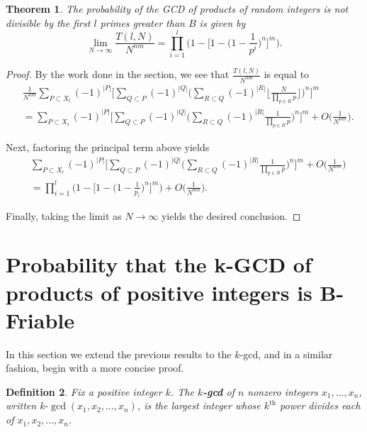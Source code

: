\documentclass[12pt]{amsart}
\newtheorem{theorem}{Theorem}[subsection]
\newtheorem{definition}[theorem]{Definition}
\theoremstyle{definition}
\begin{document}
\begin{theorem} The probability of the GCD of products of random integers is not divisible by the first $l$ primes greater than $B$ is given by 
	$$\lim_{N\to\infty} \frac{T(l,N)}{N^{nm}} = \prod_{i=1}^{l} \Big(1 - \Big[1 - \Big(1-\frac{1}{p^i}\Big)^n\Big]^m\Big).$$
\end{theorem}

\begin{proof}
	By the work done in the section, we see that $\displaystyle \frac{T(l,N)}{N^{nm}}$ is equal to 
	\begin{align*}
		&\frac{1}{N^{nm}}\sum_{P\subset X_l}{(-1)^{|P|}}\Big[\sum_{Q\subset P}(-1)^{|Q|}\Big(\sum_{R\subset Q}(-1)^{|R|}\Big\lfloor\frac{N}{\prod_{p\in R} p} \Big\rfloor\Big)^n\Big]^m\\
		&= \sum_{P\subset X_l}{(-1)^{|P|}} \Big[\sum_{Q\subset P}(-1)^{|Q|} \Big(\sum_{R\subset Q}(-1)^{|R|} \frac{1}{\prod_{p\in R} p}\Big)^n\Big]^m+O\Big(\frac{1}{N^{nm}}\Big).
	\end{align*}
	
	\noindent Next, factoring the principal term above yields
	\begin{align*}
		&\sum_{P\subset X_l}{(-1)^{|P|}} \Big[\sum_{Q\subset P}(-1)^{|Q|} \Big(\sum_{R\subset Q}(-1)^{|R|}\frac{1}{\prod_{p\in R} p}\Big)^n \Big]^m + O\Big(\frac{1}{N^{nm}}\Big)\\ &= \prod_{i=1}^{l} \Big(1 - \Big[1 - \Big(1 - \frac{1}{p_i}\Big)^n\Big]^m \Big) + O\Big(\frac{1}{N^{mn}}\Big). 
	\end{align*}
	
	\noindent Finally, taking the limit as $N \to \infty$ yields the desired conclusion.
\end{proof}

\section{Probability that the k-GCD of products of positive integers is  B-Friable}
In this section we extend the previous results to the $k$-gcd, and in a similar fashion, begin with a more concise proof.

\begin{definition} Fix a positive integer $k$. The \textbf{$k$-gcd} of $n$ nonzero integers $x_1, ..., x_n$, written $k\text{-}\gcd(x_1,x_2, ...,x_n)$, is the largest integer whose $k^{\text{th}}$ power divides each of $x_1, x_2, ..., x_n$.
\end{definition}	
\end{document}
